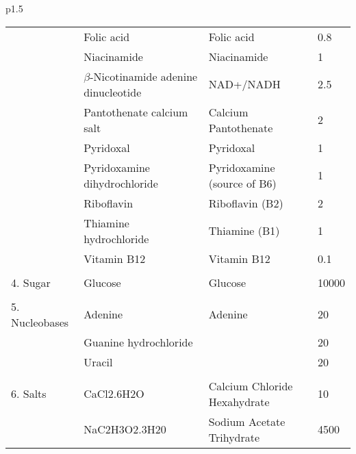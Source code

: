 {\begin{tabular}{p{}}
\begin{tabular}{llll}
		& Folic acid                          & Folic acid                              & 0.8                  \\
		& Niacinamide                         & Niacinamide                             & 1                    \\
		& $\beta$-Nicotinamide adenine dinucleotide & NAD+/NADH                               & 2.5                  \\
		& Pantothenate calcium salt           & Calcium Pantothenate                    & 2                    \\
		& Pyridoxal                           & Pyridoxal                               & 1                    \\
		& Pyridoxamine dihydrochloride        & Pyridoxamine (source of B6)             & 1                    \\
		& Riboflavin                          & Riboflavin (B2)                         & 2                    \\
		& Thiamine hydrochloride              & Thiamine (B1)                           & 1                    \\
		& Vitamin B12                         & Vitamin B12                             & 0.1                  \\
		&                                     &                                         &                      \\
		4. Sugar         & Glucose                             & Glucose                                 & 10000                \\
		&                                     &                                         &                      \\
		5. Nucleobases   & Adenine                             & Adenine                                 & 20                   \\
		& Guanine hydrochloride               &                                         & 20                   \\
		& Uracil                              &                                         & 20                   \\
		&                                     &                                         &                      \\
		6. Salts         & CaCl2.6H2O                          & Calcium Chloride Hexahydrate            & 10                   \\
		& NaC2H3O2.3H20                       & Sodium Acetate Trihydrate               & 4500                 \\

\end{tabular}
\end{tabular}}
